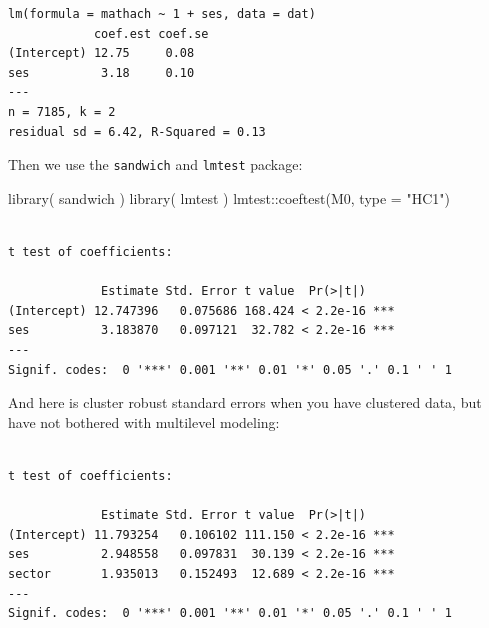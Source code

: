 \documentclass[
  letterpaper,
  DIV=11,
  numbers=noendperiod]{scrreprt}
\newenvironment{Shaded}{\begin{snugshade}}{\end{snugshade}}
\newcommand{\AttributeTok}[1]{\textcolor[rgb]{0.49,0.56,0.16}{#1}}
\newcommand{\DecValTok}[1]{\textcolor[rgb]{0.25,0.63,0.44}{#1}}
\newcommand{\FunctionTok}[1]{\textcolor[rgb]{0.02,0.16,0.49}{#1}}
\newcommand{\NormalTok}[1]{\textcolor[rgb]{0.00,0.44,0.13}{#1}}
\newcommand{\OtherTok}[1]{\textcolor[rgb]{0.00,0.44,0.13}{#1}}
\newcommand{\SpecialCharTok}[1]{\textcolor[rgb]{0.25,0.44,0.63}{#1}}
\newcommand{\StringTok}[1]{\textcolor[rgb]{0.25,0.44,0.63}{#1}}
\begin{document}
\begin{verbatim}
lm(formula = mathach ~ 1 + ses, data = dat)
            coef.est coef.se
(Intercept) 12.75     0.08  
ses          3.18     0.10  
---
n = 7185, k = 2
residual sd = 6.42, R-Squared = 0.13
\end{verbatim}

Then we use the \texttt{sandwich} and \texttt{lmtest} package:

\begin{Shaded}
\begin{Highlighting}[]
\FunctionTok{library}\NormalTok{( sandwich )}
\FunctionTok{library}\NormalTok{( lmtest )}
\NormalTok{lmtest}\SpecialCharTok{::}\FunctionTok{coeftest}\NormalTok{(M0, }\AttributeTok{type =} \StringTok{"HC1"}\NormalTok{)}
\end{Highlighting}
\end{Shaded}

\begin{verbatim}

t test of coefficients:

             Estimate Std. Error t value  Pr(>|t|)    
(Intercept) 12.747396   0.075686 168.424 < 2.2e-16 ***
ses          3.183870   0.097121  32.782 < 2.2e-16 ***
---
Signif. codes:  0 '***' 0.001 '**' 0.01 '*' 0.05 '.' 0.1 ' ' 1
\end{verbatim}

And here is cluster robust standard errors when you have clustered data,
but have not bothered with multilevel modeling:

\begin{Shaded}
\end{Shaded}

\begin{verbatim}

t test of coefficients:

             Estimate Std. Error t value  Pr(>|t|)    
(Intercept) 11.793254   0.106102 111.150 < 2.2e-16 ***
ses          2.948558   0.097831  30.139 < 2.2e-16 ***
sector       1.935013   0.152493  12.689 < 2.2e-16 ***
---
Signif. codes:  0 '***' 0.001 '**' 0.01 '*' 0.05 '.' 0.1 ' ' 1
\end{verbatim}
\end{document}
